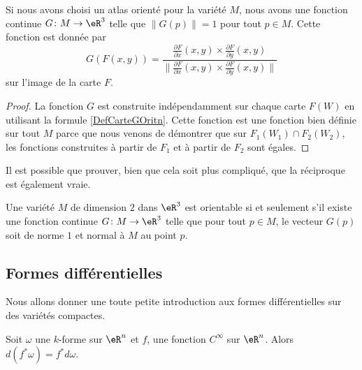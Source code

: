 \begin{corollary}
	Si nous avons choisi un atlas orienté pour la variété $M$, nous avons une fonction continue $G\colon M\to \eR^3$ telle que $\| G(p) \|=1$ pour tout $p\in M$. Cette fonction est donnée par
	\begin{equation}		\label{DefCarteGOritn}
		G(F(x,y))=\frac{   \frac{ \partial F }{ \partial x }(x,y)\times\frac{ \partial F }{ \partial y }(x,y)   }{ \| \frac{ \partial F }{ \partial x }(x,y)\times\frac{ \partial F }{ \partial y }(x,y)\| }
	\end{equation}
	sur l'image de la carte $F$.
\end{corollary}

\begin{proof}
	La fonction $G$ est construite indépendamment sur chaque carte $F(W)$ en utilisant la formule \eqref{DefCarteGOritn}. Cette fonction est une fonction bien définie sur tout $M$ parce que nous venons de démontrer que sur $F_1(W_1)\cap F_2(W_2)$, les fonctions construites à partir de $F_1$ et à partir de $F_2$ sont égales.
\end{proof}

Il est possible que prouver, bien que cela soit plus compliqué, que la réciproque est également vraie.
\begin{proposition}
	Une variété $M$ de dimension $2$ dans $\eR^3$ est orientable si et seulement s'il existe une fonction continue $G\colon M\to \eR^3$ telle que pour tout $p\in M$, le vecteur $G(p)$ soit de norme $1$ et normal à $M$ au point $p$.
\end{proposition}

\subsection{Formes différentielles}

Nous allons donner une toute petite introduction aux formes différentielles sur des variétés compactes.

\begin{lemma}       \label{LemdwLGFG}
    Soit \( \omega\) une \( k\)-forme sur \( \eR^n\) et \( f\), une fonction \( C^{\infty}\) sur \( \eR^n\). Alors \( d(f^*\omega)=f^*d\omega\).
\end{lemma}

